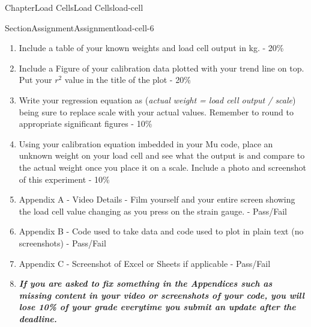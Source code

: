 \documentclass[oneside,10pt,]{book}
\newcommand{\alert}[1]{\textbf{\textit{#1}}}
\numberwithin{equation}{section}
\begin{document}
\begin{chapterptx}{Chapter}{Load Cells}{}{Load Cells}{}{}{load-cell}
\begin{sectionptx}{Section}{Assignment}{}{Assignment}{}{}{load-cell-6}
\begin{introduction}{}
\begin{enumerate}
\item{}Include a table of your known weights and load cell output in kg. - 20\%%
\item{}Include a Figure of your calibration data plotted with your trend line on top. Put your \(r^2\) value in the title of the plot - 20\%%
\item{}Write your regression equation as (\emph{actual weight = load cell output \slash{} scale}) being sure to replace scale with your actual values. Remember to round to appropriate significant figures - 10\%%
\item{}Using your calibration equation imbedded in your Mu code, place an unknown weight on your load cell and see what the output is and compare to the actual weight once you place it on a scale. Include a photo and screenshot of this experiment - 10\%%
\item{}Appendix A - Video Details - Film yourself and your entire screen showing the load cell value changing as you press on the strain gauge. - Pass\slash{}Fail%
\item{}Appendix B - Code used to take data and code used to plot in plain text (no screenshots) - Pass\slash{}Fail%
\item{}Appendix C - Screenshot of Excel or Sheets if applicable - Pass\slash{}Fail%
\item{}\alert{If you are asked to fix something in the Appendices such as missing content in your video or screenshots of your code, you will lose 10\% of your grade everytime you submit an update after the deadline.}%
\end{enumerate}
\end{introduction}%
\end{sectionptx}
\end{chapterptx}
%
%
\typeout{************************************************}
\typeout{************************************************}
%
\end{document}
